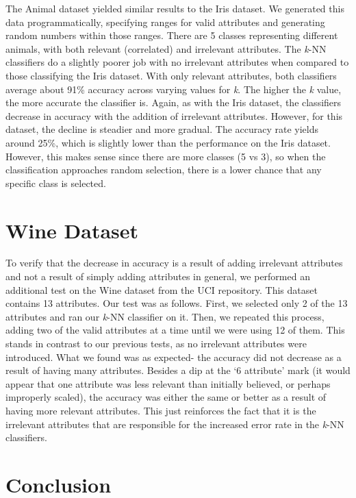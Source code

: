 \documentclass{article}
\begin{document}
The Animal dataset yielded similar results to the Iris dataset. We generated this data programmatically, specifying ranges for valid attributes and generating random numbers within those ranges. There are 5 classes representing different animals, with both relevant (correlated) and irrelevant attributes. The \textit{k}-NN classifiers do a slightly poorer job with no irrelevant attributes when compared to those classifying the Iris dataset. With only relevant attributes, both classifiers average about 91\% accuracy across varying values for \textit{k}. The higher the \textit{k} value, the more accurate the classifier is. Again, as with the Iris dataset, the classifiers decrease in accuracy with the addition of irrelevant attributes. However, for this dataset, the decline is steadier and more gradual. The accuracy rate yields around 25\%, which is slightly lower than the performance on the Iris dataset. However, this makes sense since there are more classes (5 vs 3), so when the classification approaches random selection, there is a lower chance that any specific class is selected.

\section{Wine Dataset}

To verify that the decrease in accuracy is a result of adding irrelevant attributes and not a result of simply adding attributes in general, we performed an additional test on the Wine dataset from the UCI repository. This dataset contains 13 attributes. Our test was as follows. First, we selected only 2 of the 13 attributes and ran our \textit{k}-NN classifier on it. Then, we repeated this process, adding two of the valid attributes at a time until we were using 12 of them. This stands in contrast to our previous tests, as no irrelevant attributes were introduced. What we found was as expected- the accuracy did not decrease as a result of having many attributes. Besides a dip at the ‘6 attribute’ mark (it would appear that one attribute was less relevant than initially believed, or perhaps improperly scaled), the accuracy was either the same or better as a result of having more relevant attributes. This just reinforces the fact that it is the irrelevant attributes that are responsible for the increased error rate in the \textit{k}-NN classifiers.

\section{Conclusion}
\end{document}
